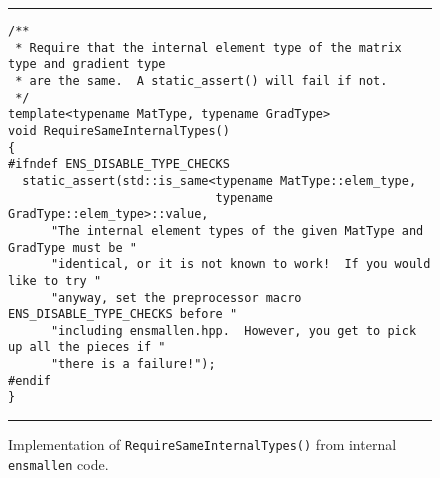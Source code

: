 \begin{figure}[t]
\hrule
\vspace{1ex}
\begin{verbatim}
/**
 * Require that the internal element type of the matrix type and gradient type
 * are the same.  A static_assert() will fail if not.
 */
template<typename MatType, typename GradType>
void RequireSameInternalTypes()
{
#ifndef ENS_DISABLE_TYPE_CHECKS
  static_assert(std::is_same<typename MatType::elem_type,
                             typename GradType::elem_type>::value,
      "The internal element types of the given MatType and GradType must be "
      "identical, or it is not known to work!  If you would like to try "
      "anyway, set the preprocessor macro ENS_DISABLE_TYPE_CHECKS before "
      "including ensmallen.hpp.  However, you get to pick up all the pieces if "
      "there is a failure!");
#endif
}
\end{verbatim}
\hrule
\vspace*{-0.5em}
\caption{Implementation of {\tt RequireSameInternalTypes()} from internal
{\tt ensmallen} code.
}
\label{fig:rsit}
\end{figure}
